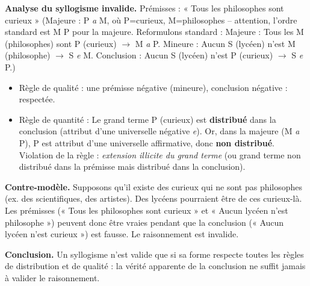 \documentclass[11pt]{article}
\begin{document}
\begin{exoresolu}
\textbf{Analyse du syllogisme invalide.}
Prémisses : « Tous les philosophes sont curieux » (Majeure : P \textit{a} M, où P=curieux, M=philosophes -- attention, l'ordre standard est M P pour la majeure. Reformulons standard : Majeure : Tous les M (philosophes) sont P (curieux) $\rightarrow$ M \textit{a} P. Mineure : Aucun S (lycéen) n'est M (philosophe) $\rightarrow$ S \textit{e} M. Conclusion : Aucun S (lycéen) n'est P (curieux) $\rightarrow$ S \textit{e} P.)
\begin{itemize}
\item Règle de qualité : une prémisse négative (mineure), conclusion négative : respectée.
\item Règle de quantité : Le grand terme P (curieux) est \textbf{distribué} dans la conclusion (attribut d'une universelle négative \textit{e}). Or, dans la majeure (M \textit{a} P), P est attribut d'une universelle affirmative, donc \textbf{non distribué}. Violation de la règle : \emph{extension illicite du grand terme} (ou grand terme non distribué dans la prémisse mais distribué dans la conclusion).
\end{itemize}

\textbf{Contre-modèle.} Supposons qu'il existe des curieux qui ne sont pas philosophes (ex. des scientifiques, des artistes). Des lycéens pourraient être de ces curieux-là. Les prémisses (« Tous les philosophes sont curieux » et « Aucun lycéen n'est philosophe ») peuvent donc être vraies pendant que la conclusion (« Aucun lycéen n'est curieux ») est fausse. Le raisonnement est invalide.

\textbf{Conclusion.} Un syllogisme n'est valide que si sa forme respecte toutes les règles de distribution et de qualité : la vérité apparente de la conclusion ne suffit jamais à valider le raisonnement.
\end{exoresolu}
\end{document}
